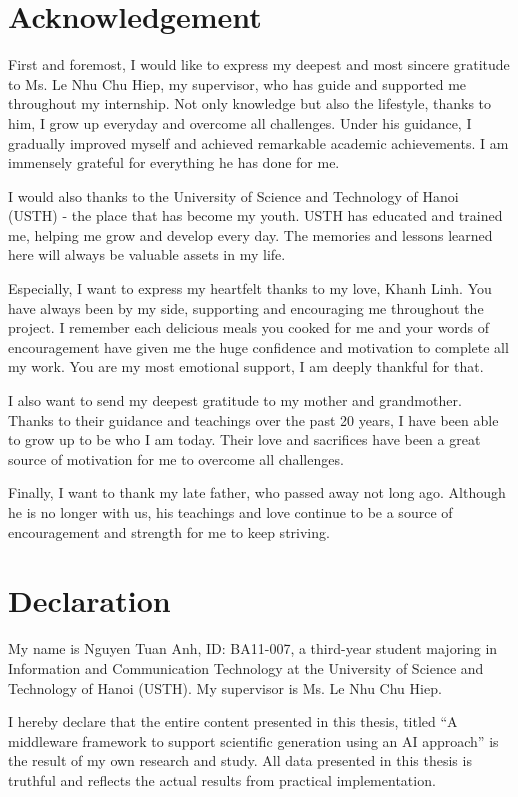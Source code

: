 \documentclass{article}
\begin{document}
\thispagestyle{empty} %
\section*{Acknowledgement}
First and foremost, I would like to express my deepest and most sincere gratitude to Ms. Le Nhu Chu Hiep, my supervisor, who has guide and supported me throughout my internship. Not only knowledge but also the lifestyle, thanks to him, I grow up everyday and overcome all challenges. Under his guidance, I gradually improved myself and achieved remarkable academic achievements. I am immensely grateful for everything he has done for me.

I would also thanks to the University of Science and Technology of Hanoi (USTH) - the place that has become my youth. USTH has educated and trained me, helping me grow and develop every day. The memories and lessons learned here will always be valuable assets in my life.

Especially, I want to express my heartfelt thanks to my love, Khanh Linh. You have always been by my side, supporting and encouraging me throughout the project. I remember each delicious meals you cooked for me and your words of encouragement have given me the huge confidence and motivation to complete all my work. You are my most emotional support, I am deeply thankful for that.

I also want to send my deepest gratitude to my mother and grandmother. Thanks to their guidance and teachings over the past 20 years, I have been able to grow up to be who I am today. Their love and sacrifices have been a great source of motivation for me to overcome all challenges.

Finally, I want to thank my late father, who passed away not long ago. Although he is no longer with us, his teachings and love continue to be a source of encouragement and strength for me to keep striving.
\cleardoublepage

\thispagestyle{empty}
\section*{Declaration}
My name is Nguyen Tuan Anh, ID: BA11-007, a third-year student majoring in Information and Communication Technology at the University of Science and Technology of Hanoi (USTH). My supervisor is Ms. Le Nhu Chu Hiep.

I hereby declare that the entire content presented in this thesis, titled “A middleware framework to support scientific generation using an AI approach” is the result of my own research and study. All data presented in this thesis is truthful and reflects the actual results from practical implementation.
\end{document}

